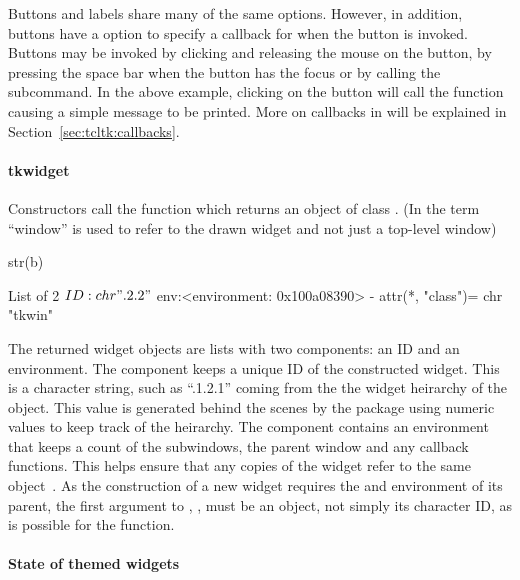 Buttons and labels share many of the same options. However, in
addition, buttons have a  option to
specify a callback for when the button is invoked. Buttons may be
invoked by clicking and releasing the mouse on the button, by pressing
the space bar when the button has the focus or by calling the
 subcommand. In the above example, clicking on the
button will call the function causing a simple message to be printed. More on callbacks in 
will be explained in Section~\ref{sec:tcltk:callbacks}.

\paragraph{tkwidget}
Constructors call the  function which returns an
object of class . (In \TK\/ the term ``window'' is used to
refer to the drawn widget and not just a top-level window)

\begin{Schunk}
\begin{Sinput}
 str(b)
\end{Sinput}
\begin{Soutput}
List of 2
 $ ID : chr ".2.2"
 $ env:<environment: 0x100a08390> 
 - attr(*, "class")= chr "tkwin"
\end{Soutput}
\end{Schunk}

The returned widget objects are lists with two components: an ID and an
environment. The  component keeps a unique ID of the
constructed widget. This is a character string, such as ``.1.2.1''
coming from the the widget heirarchy of the object. This value is
generated behind the scenes by the  package using numeric
values to keep track of the heirarchy. The  component
contains an environment that keeps a count of the subwindows, the parent
window and any callback functions. This helps ensure that any copies
of the widget refer to the same object~\citep{Dalgaard-DSC}. As the
construction of a new widget requires the  and environment of
its parent, the first argument to , ,
must be an \R\/ \TK\/ object, not simply its character ID, as is
possible for the  function.



\paragraph{State of themed widgets}

